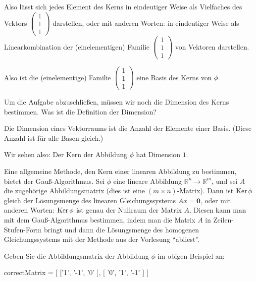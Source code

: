 \documentclass{ximera}
\begin{document}
Also lässt sich jedes Element des Kerns in eindeutiger Weise als Vielfaches des Vektors 
$\left( \begin{array}{c}
    1 \\ 1\\ 1
\end{array} \right)$ darstellen, oder mit anderen Worten: in eindeutiger Weise als Linearkombination der (einelementigen) Familie
$\left( \begin{array}{c}
    1 \\ 1\\ 1
\end{array} \right)$ von Vektoren darstellen.

Also ist die (einelementige) Familie 
$\left( \begin{array}{c}
    1 \\ 1\\ 1
\end{array} \right)$ eine Basis des Kerns von $\phi$.


\begin{question}
Um die Aufgabe abzuschließen, müssen wir noch die Dimension des Kerns bestimmen. Was ist die Definition der Dimension?
    \begin{solution}
        \begin{free-response}
Die Dimension eines Vektorraums ist die Anzahl der Elemente einer Basis. (Diese Anzahl ist für alle Basen gleich.)
        \end{free-response}
    \end{solution}
\end{question}


Wir sehen also: Der Kern der Abbildung $\phi$ hat Dimension $1$.



Eine allgemeine Methode, den Kern einer linearen Abbildung zu bestimmen, bietet der Gauß-Algorithmus. Sei $\phi$ eine lineare Abbildung $\mathbb R^n\rightarrow \mathbb R^m$, und sei $A$ die zugehörige Abbildungsmatrix (dies ist eine $(m\times n)$-Matrix). Dann ist $\mathop{\rm Ker} \phi$ gleich der Lösungsmenge des linearen Gleichungssystems $Ax=\mathbf{0}$, oder mit anderen Worten: $\mathop{\rm Ker} \phi$ ist genau der Nullraum der Matrix $A$. Diesen kann man mit dem Gauß-Algorithmus bestimmen, indem man die Matrix $A$ in Zeilen-Stufen-Form bringt und dann die Lösungsmenge des homogenen Gleichungssystems mit der Methode aus der Vorlesung ``abliest''.

\begin{question}
Geben Sie die Abbildungsmatrix der Abbildung $\phi$ im obigen Beispiel an:
\begin{matrix-answer}
correctMatrix = [ ['1', '-1', '0' ], [ '0', '1', '-1' ] ]
\end{matrix-answer}
\end{question}
\end{document}

